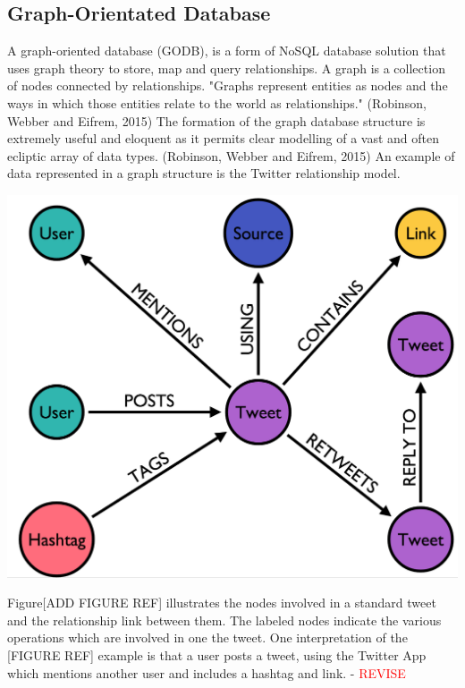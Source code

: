\subsection{Graph-Orientated Database}
A graph-oriented database (GODB), is a form of NoSQL database solution that uses graph theory to store, map and query relationships. A graph is a collection of nodes connected by relationships. "Graphs represent entities as nodes and the ways in which those entities relate to the world as relationships." (Robinson, Webber and Eifrem, 2015) The formation of the graph database structure is extremely useful and eloquent as it permits clear modelling of a vast and often ecliptic array of data types. (Robinson, Webber and Eifrem, 2015) An example of data represented in a graph structure is the Twitter relationship model. \begin{center}\includegraphics[width=0.5\linewidth]{images/graphdb_twitter}\end{center}  Figure[ADD FIGURE REF] illustrates the nodes involved in a standard tweet and the relationship link between them. The labeled nodes indicate the various operations which are involved in one the tweet. One interpretation of the [FIGURE REF] example is that a user posts a tweet, using the Twitter App which mentions another user and includes a hashtag and link. - \textcolor{red}{REVISE}

